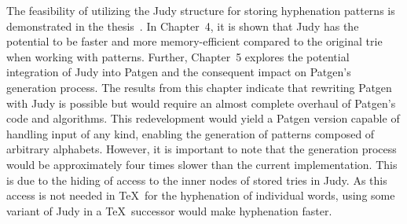 \documentclass{csbulletin}
\let\program=\textrm %
\newcommand{\Patgen}{\program{Patgen}\xspace}
\begin{document}
The feasibility of utilizing the Judy structure for storing hyphenation patterns is demonstrated in the thesis~\cite{tex:Maca-bachelor2023fortugboat}.
In Chapter~4, it is shown that Judy has the potential to be faster and more memory-efficient compared to the original trie when working with patterns.
Further, Chapter~5 explores the potential integration of Judy into \Patgen and the consequent impact on \Patgen's generation process.
The results from this chapter indicate that rewriting \Patgen with Judy is possible but would require an almost complete overhaul of \Patgen's code and algorithms.
This redevelopment would yield a \Patgen version capable of handling input of any kind, enabling the generation of patterns composed of arbitrary alphabets.
However, it is important to note that the generation process would be approximately four times slower than the current implementation.
This is due to the hiding of access to the inner nodes of stored tries in Judy.
As this access is not needed in \TeX\ for the hyphenation of individual words, using some variant of Judy in a \TeX\ successor would make hyphenation faster.
\end{document}
